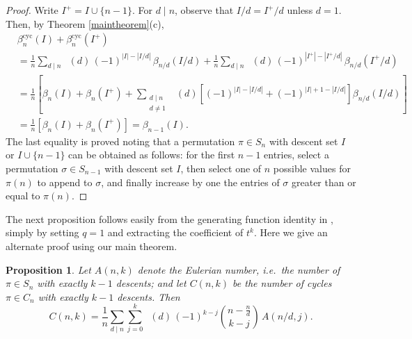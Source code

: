 \documentclass[12pt]{article}
\newcommand{\Perm}{S}
\newcommand{\Cyc}{C}
\newcommand{\betacyc}{\beta^{\text{cyc}}}
\DeclareMathOperator{\mob}{M\ddot{o}b}
\newtheorem{prop}[thm]{Proposition}
\theoremstyle{definition}
\begin{document}
\begin{proof} Write $I^+ = I \cup \{n-1\}$. For $d \mid n$, observe that $I/d = I^+/d$ unless $d = 1$. Then, by Theorem \ref{maintheorem}(c),
\begin{align*}
&\betacyc_n(I) + \betacyc_n(I^+) \\
&= \frac{1}{n} \sum_{\text{$d \mid n$}} \mob(d)\,(-1)^{|I|-|I/d|}\,\beta_{n/d}(I/d) + \frac{1}{n} \sum_{\text{$d \mid n$}} \mob(d)\,(-1)^{|I^+|-|I^+/d|}\,\beta_{n/d}(I^+/d) \\
&= \frac{1}{n}\left[\beta_n(I) + \beta_n(I^+) + \sum_{\substack{\text{$d \mid n$}\\d \not= 1}} \mob(d)\left[(-1)^{|I|-|I/d|} + (-1)^{|I|+1-|I/d|}\right] \beta_{n/d}(I/d) \right] \\
&= \frac{1}{n}\left[\beta_n(I) + \beta_n(I^+)\right]=\beta_{n-1}(I).
\end{align*}
The last equality is proved noting that a permutation $\pi \in \Perm_n$ with descent set $I$ or $I \cup\{n-1\}$ can be obtained as follows: for the first $n-1$ entries, select a permutation $\sigma\in\Perm_{n-1}$ with descent set $I$, then select one of $n$ possible values for $\pi(n)$ to append to $\sigma$, and finally increase by one the entries of $\sigma$ greater than or equal to $\pi(n)$. \end{proof}


The next proposition follows easily from the generating function identity in \cite[Cor.\ 6.2]{GR}, simply by setting $q = 1$ and extracting the coefficient of $t^k$. Here we give an alternate proof using our main theorem.

\begin{prop} \label{desnum} Let $A(n,k)$ denote the Eulerian number, \textit{i.e.}\ the number of $\pi \in \Perm_n$ with exactly $k-1$ descents; and let $C(n,k)$ be the number of cycles $\pi \in \Cyc_n$ with exactly $k-1$ descents. Then
\[ C(n,k) = \frac{1}{n} \sum_{\text{$d \mid n$}} \sum_{j=0}^k \mob(d)\,(-1)^{k-j} \binom{n - \frac{n}{d}}{k-j}\,A(n/d,j). \]
\end{prop}
\end{document}
